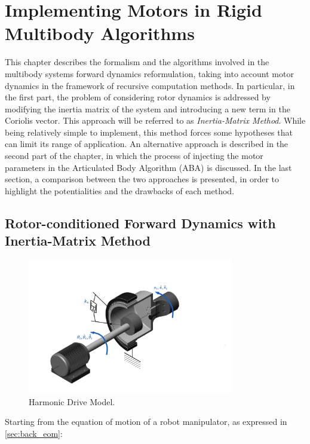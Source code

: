 \chapter{Implementing Motors in Rigid Multibody Algorithms}
\label{chp:contrib_ABA}

This chapter describes the formalism and the algorithms involved in the multibody systems forward dynamics reformulation, taking into account motor dynamics in the framework of recursive computation methods. In particular, in the first part, the problem of considering rotor dynamics is addressed by modifying the inertia matrix of the system and introducing a new term in the Coriolis vector. This approach will be referred to as \textit{Inertia-Matrix Method}. While being relatively simple to implement, this method forces some hypotheses that can limit its range of application. An alternative approach is described in the second part of the chapter, in which the process of injecting the motor parameters in the Articulated Body Algorithm (\ac{ABA}) is discussed. In the last section, a comparison between the two approaches is presented, in order to highlight the potentialities and the drawbacks of each method.

\section{Rotor-conditioned Forward Dynamics with Inertia-Matrix Method}

\begin{figure}
    \centering
    \caption{Harmonic Drive Model.}
    \label{fig:harmonic_drive}
    \includegraphics[width=0.8\textwidth]{Images/harmonic_drive.png}
\end{figure}

Starting from the equation of motion of a robot manipulator, as expressed in \cref{sec:back_eom}:

